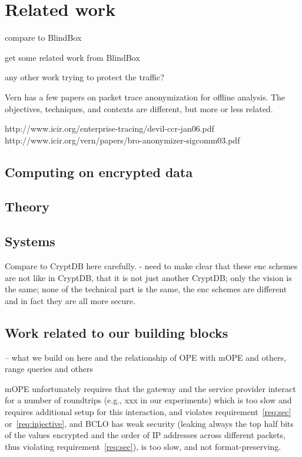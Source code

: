
\section{Related work}\label{sec:related}

compare to BlindBox

get some related work from BlindBox

any other work trying to protect the traffic? 

Vern has a few papers on packet trace anonymization for offline analysis. The objectives, techniques, and contexts are different, but more or less related.

http://www.icir.org/enterprise-tracing/devil-ccr-jan06.pdf
http://www.icir.org/vern/papers/bro-anonymizer-sigcomm03.pdf



\subsection{Computing on encrypted data}

\subsection{Theory}


\subsection{Systems}

Compare to CryptDB here carefully. 
- need to make clear that these enc schemes are not like in CryptDB, that it is not just another CryptDB; only the vision is the same; %
none of the technical part is the same, the enc schemes are different and in fact they are all more secure. 

\subsection{Work related to our building blocks}

-- what we build on here and the relationship of OPE with mOPE and others, range queries and others


 mOPE unfortunately requires that the gateway and the service provider interact for a number of roundtrips (e.g., xxx in our experiments) which is too slow and requires additional setup for this interaction, and violates requirement~\ref{req:sec} or~\ref{req:injective}, and BCLO has weak security (leaking always the top half bits of the values encrypted and the order of IP addresses across different packets, thus violating requirement~\ref{req:sec}), is too slow, and not format-preserving. 

